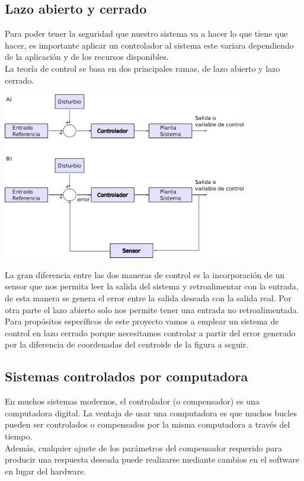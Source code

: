 \subsection{Lazo abierto y cerrado}
Para poder tener la seguridad que nuestro sistema va a hacer lo que tiene que hacer, es importante
aplicar un controlador al sistema este variara dependiendo de la aplicación y de los recursos
disponibles.\\
La teoría de control se basa en dos principales ramas, de lazo abierto y lazo cerrado.
\begin{center}
	\includegraphics[width=0.8\textwidth]{Contenido/Cuerpo/Capitulo2/Fig21.eps}
	\label{fig:MarcoTeorico:Fig25}
\end{center}
La gran diferencia entre las dos maneras de control es la incorporación de un sensor que nos
permita leer la salida del sistema y retroalimentar con la entrada, de esta manera se genera
el error entre la salida deseada con la salida real. Por otra parte el lazo abierto solo nos permite
tener una entrada no retroalimentada.\\
Para propósitos específicos de este proyecto vamos a emplear un sistema de control en lazo cerrado
porque necesitamos controlar a partir del error generado por la diferencia de coordenadas del
centroide de la figura a seguir.


\subsection{Sistemas controlados por computadora}
En muchos sistemas modernos, el controlador (o compensador) es una computadora digital. La ventaja
de usar una computadora es que muchos bucles pueden ser controlados o compensados por la misma
computadora a través del tiempo. \cite{Book:Nise2010}\\
Además, cualquier ajuste de los parámetros del compensador requerido para producir una respuesta
deseada puede realizarse mediante cambios en el software en lugar del hardware.